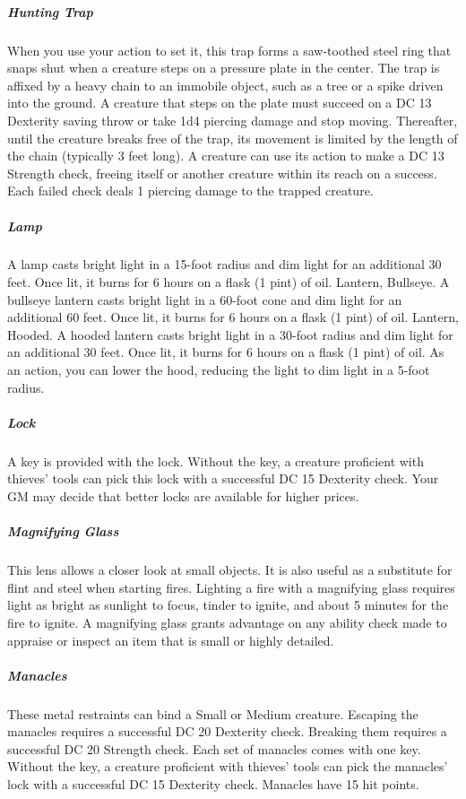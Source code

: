 \subparagraph*{Hunting Trap} When you use your action to set it, this trap forms a saw-toothed steel ring that snaps shut when a creature steps on a pressure plate in the center. The trap is affixed by a heavy chain to an immobile object, such as a tree or a spike driven into the ground. A creature that steps on the plate must succeed on a DC 13 Dexterity saving throw or take 1d4 piercing damage and stop moving. Thereafter, until the creature breaks free of the trap, its movement is limited by the length of the chain (typically 3 feet long). A creature can use its action to make a DC 13 Strength check, freeing itself or another creature within its reach on a success. Each failed check deals 1 piercing damage to the trapped creature.

\subparagraph*{Lamp} A lamp casts bright light in a 15-foot radius and dim light for an additional 30 feet. Once lit, it burns for 6 hours on a flask (1 pint) of oil.
Lantern, Bullseye. A bullseye lantern casts bright light in a 60-foot cone and dim light for an additional 60 feet. Once lit, it burns for 6 hours on a flask (1 pint) of oil.
Lantern, Hooded. A hooded lantern casts bright light in a 30-foot radius and dim light for an additional 30 feet. Once lit, it burns for 6 hours on a flask (1 pint) of oil. As an action, you can lower the hood, reducing the light to dim light in a 5-foot radius.

\subparagraph*{Lock} A key is provided with the lock. Without the key, a creature proficient with thieves' tools can pick this lock with a successful DC 15 Dexterity check. Your GM may decide that better locks are available for higher prices.

\subparagraph*{Magnifying Glass} This lens allows a closer look at small objects. It is also useful as a substitute for flint and steel when starting fires. Lighting a fire with a magnifying glass requires light as bright as sunlight to focus, tinder to ignite, and about 5 minutes for the fire to ignite. A magnifying glass grants advantage on any ability check made to appraise or inspect an item that is small or highly detailed.

\subparagraph*{Manacles} These metal restraints can bind a Small or Medium creature. Escaping the manacles requires a successful DC 20 Dexterity check. Breaking them requires a successful DC 20 Strength check. Each set of manacles comes with one key. Without the key, a creature proficient with thieves' tools can pick the manacles' lock with a successful DC 15 Dexterity check. Manacles have 15 hit points.

